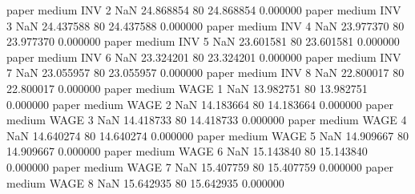             paper     medium      INV                 2                  NaN 24.868854 80      24.868854           0.000000
            paper     medium      INV                 3                  NaN 24.437588 80      24.437588           0.000000
            paper     medium      INV                 4                  NaN 23.977370 80      23.977370           0.000000
            paper     medium      INV                 5                  NaN 23.601581 80      23.601581           0.000000
            paper     medium      INV                 6                  NaN 23.324201 80      23.324201           0.000000
            paper     medium      INV                 7                  NaN 23.055957 80      23.055957           0.000000
            paper     medium      INV                 8                  NaN 22.800017 80      22.800017           0.000000
            paper     medium     WAGE                 1                  NaN 13.982751 80      13.982751           0.000000
            paper     medium     WAGE                 2                  NaN 14.183664 80      14.183664           0.000000
            paper     medium     WAGE                 3                  NaN 14.418733 80      14.418733           0.000000
            paper     medium     WAGE                 4                  NaN 14.640274 80      14.640274           0.000000
            paper     medium     WAGE                 5                  NaN 14.909667 80      14.909667           0.000000
            paper     medium     WAGE                 6                  NaN 15.143840 80      15.143840           0.000000
            paper     medium     WAGE                 7                  NaN 15.407759 80      15.407759           0.000000
            paper     medium     WAGE                 8                  NaN 15.642935 80      15.642935           0.000000